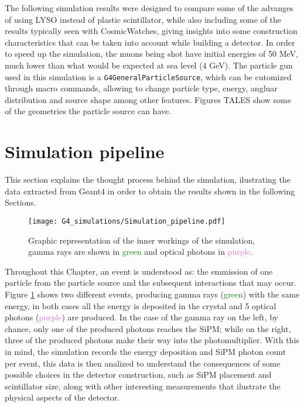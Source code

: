 The following simulation results were designed to compare some of the advanges of using LYSO instead of plastic scintillator, while also including some of the results typically seen with CosmicWatches, giving insights into some construction characteristics that can be taken into account while building a detector. In order to speed up the simulation, the muons being shot have initial energies of 50 \unit{\mega\eV}, much lower than what would be expected at sea level (4 \unit{\giga\eV}). The particle gun used in this simulation is a \texttt{G4GeneralParticleSource}, which can be cutomized through macro commands, allowing to change particle type, energy, angluar distribution and source shape among other features. Figures TALES show some of the geometries the particle source can have.

\section{Simulation pipeline}

This section explains the thought process behind the simulation, ilustrating the data extracted from Geant4 in order to obtain the results shown in the following Sections.

\begin{figure}[H]
  \centering
    \texttt{[image: G4\_simulations/Simulation\_pipeline.pdf]}
  \caption{\label{fig:sim_pipeline}Graphic representation of the inner workings of the simulation, gamma rays are shown in \textcolor{green}{green} and optical photons in \textcolor{Orchid}{purple}.}
\end{figure}

Throughout this Chapter, an event is understood as: the emmission of one particle from the particle source and the subsequent interactions that may occur. Figure \ref{fig:sim_pipeline} shows two different events, producing gamma rays (\textcolor{green}{green}) with the same energy, in both cases all the energy is deposited in the crystal and 5 optical photons (\textcolor{Orchid}{purple}) are produced. In the case of the gamma ray on the left, by chance, only one of the produced photons reaches the SiPM; while on the right, three of the produced photons make their way into the photomultiplier. With this in mind, the simulation records the energy deposition and SiPM photon count per event, this data is then analized to understand the consequences of some possible choices in the detector construction, such as SiPM placement and scintillator size, along with other interesting measurements that ilustrate the physical aspects of the detector.

